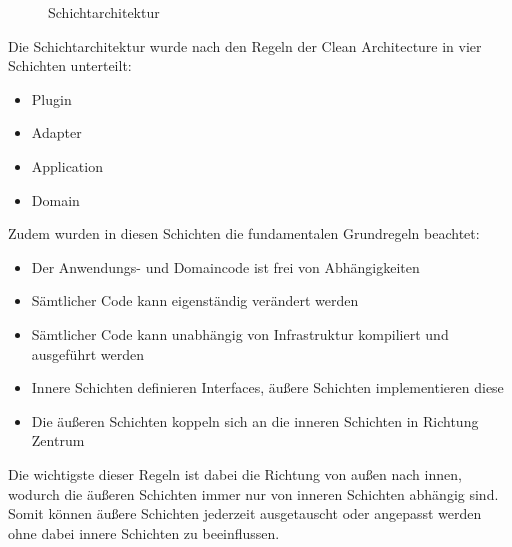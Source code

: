 \begin{figure}[htbp]
    \centering
    \caption{\label{flutter-1} Schichtarchitektur}
\end{figure}
Die Schichtarchitektur wurde nach den Regeln der Clean Architecture in vier Schichten unterteilt:
\begin{itemize}
    \item Plugin
    \item Adapter
    \item Application
    \item Domain
\end{itemize}
\newpage
Zudem wurden in diesen Schichten die fundamentalen Grundregeln beachtet:
\begin{itemize}
    \item Der Anwendungs- und Domaincode ist frei von Abhängigkeiten
    \item Sämtlicher Code kann eigenständig verändert werden
    \item Sämtlicher Code kann unabhängig von Infrastruktur kompiliert und ausgeführt werden
    \item Innere Schichten definieren Interfaces, äußere Schichten implementieren diese
    \item Die äußeren Schichten koppeln sich an die inneren Schichten in Richtung Zentrum
\end{itemize}
Die wichtigste dieser Regeln ist dabei die Richtung von außen nach innen, wodurch die äußeren Schichten immer nur von inneren Schichten abhängig sind.
Somit können äußere Schichten jederzeit ausgetauscht oder angepasst werden ohne dabei innere Schichten zu beeinflussen.



